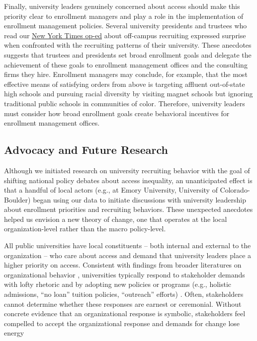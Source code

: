 \documentclass[twoside]{article}
\begin{document}
Finally, university leaders genuinely concerned about access should make this priority clear to enrollment managers and play a role in the implementation of enrollment management policies.  Several university presidents and trustees who read our \href{https://www.nytimes.com/interactive/2018/04/13/opinion/college-recruitment-rich-white.html}{New York Times op-ed} about off-campus recruiting expressed surprise when confronted with the recruiting patterns of their university.  These anecdotes suggests that trustees and presidents set broad enrollment goals and delegate the achievement of these goals to enrollment management offices and the consulting firms they hire. Enrollment managers may conclude, for example, that the most effective means of satisfying orders from above is targeting affluent out-of-state high schools and pursuing racial diversity by visiting magnet schools but ignoring traditional public schools in communities of color.  Therefore, university leaders must consider how broad enrollment goals create behavioral incentives for enrollment management offices.


\subsection*{Advocacy and Future Research}

Although we initiated research on university recruiting behavior with the goal of shifting national policy debates about access inequality, an unanticipated effect is that a handful of local actors (e.g., at Emory University, University of Colorado-Boulder) began using our data to initiate discussions with university leadership about enrollment priorities and recruiting behaviors.  These unexpected anecdotes helped us envision a new theory of change, one that operates at the local organization-level rather than the macro policy-level.

All public universities have local constituents -- both internal and external to the organization -- who care about access and demand that university leaders place a higher priority on access.  Consistent with findings from broader literatures on organizational behavior \citep{RN2436}, universities typically respond to stakeholder demands with lofty rhetoric and by adopting new policies or programs (e.g., holistic admissions, ``no loan'' tuition policies, ``outreach'' efforts) \citep[e.g., ][]{RN4017}.  Often, stakeholders cannot determine whether these responses are earnest or ceremonial. Without concrete evidence that an organizational response is symbolic, stakeholders feel compelled to accept the organizational response and demands for change lose energy
\end{document}
